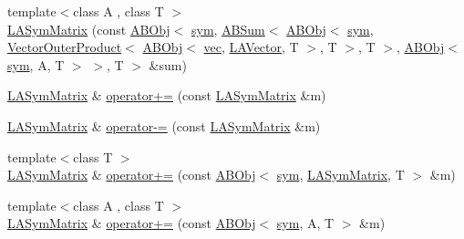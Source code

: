 \begin{DoxyCompactItemize}
\item 
{\footnotesize template$<$class A , class T $>$ }\\\mbox{\hyperlink{classROOT_1_1Minuit2_1_1LASymMatrix_aed0e1071ce94c05d4b18e7594db9a249}{L\+A\+Sym\+Matrix}} (const \mbox{\hyperlink{classROOT_1_1Minuit2_1_1ABObj}{A\+B\+Obj}}$<$ \mbox{\hyperlink{classROOT_1_1Minuit2_1_1sym}{sym}}, \mbox{\hyperlink{classROOT_1_1Minuit2_1_1ABSum}{A\+B\+Sum}}$<$ \mbox{\hyperlink{classROOT_1_1Minuit2_1_1ABObj}{A\+B\+Obj}}$<$ \mbox{\hyperlink{classROOT_1_1Minuit2_1_1sym}{sym}}, \mbox{\hyperlink{classROOT_1_1Minuit2_1_1VectorOuterProduct}{Vector\+Outer\+Product}}$<$ \mbox{\hyperlink{classROOT_1_1Minuit2_1_1ABObj}{A\+B\+Obj}}$<$ \mbox{\hyperlink{classROOT_1_1Minuit2_1_1vec}{vec}}, \mbox{\hyperlink{classROOT_1_1Minuit2_1_1LAVector}{L\+A\+Vector}}, T $>$, T $>$, T $>$, \mbox{\hyperlink{classROOT_1_1Minuit2_1_1ABObj}{A\+B\+Obj}}$<$ \mbox{\hyperlink{classROOT_1_1Minuit2_1_1sym}{sym}}, A, T $>$ $>$, T $>$ \&sum)
\item 
\mbox{\hyperlink{classROOT_1_1Minuit2_1_1LASymMatrix}{L\+A\+Sym\+Matrix}} \& \mbox{\hyperlink{classROOT_1_1Minuit2_1_1LASymMatrix_a36e303de732b9277e57d27f91bb0d56a}{operator+=}} (const \mbox{\hyperlink{classROOT_1_1Minuit2_1_1LASymMatrix}{L\+A\+Sym\+Matrix}} \&m)
\item 
\mbox{\hyperlink{classROOT_1_1Minuit2_1_1LASymMatrix}{L\+A\+Sym\+Matrix}} \& \mbox{\hyperlink{classROOT_1_1Minuit2_1_1LASymMatrix_acbe82f35c3fc1df7ccda6ab505be41c2}{operator-\/=}} (const \mbox{\hyperlink{classROOT_1_1Minuit2_1_1LASymMatrix}{L\+A\+Sym\+Matrix}} \&m)
\item 
{\footnotesize template$<$class T $>$ }\\\mbox{\hyperlink{classROOT_1_1Minuit2_1_1LASymMatrix}{L\+A\+Sym\+Matrix}} \& \mbox{\hyperlink{classROOT_1_1Minuit2_1_1LASymMatrix_a72081bd71d3b9a665f3480310100eb51}{operator+=}} (const \mbox{\hyperlink{classROOT_1_1Minuit2_1_1ABObj}{A\+B\+Obj}}$<$ \mbox{\hyperlink{classROOT_1_1Minuit2_1_1sym}{sym}}, \mbox{\hyperlink{classROOT_1_1Minuit2_1_1LASymMatrix}{L\+A\+Sym\+Matrix}}, T $>$ \&m)
\item 
{\footnotesize template$<$class A , class T $>$ }\\\mbox{\hyperlink{classROOT_1_1Minuit2_1_1LASymMatrix}{L\+A\+Sym\+Matrix}} \& \mbox{\hyperlink{classROOT_1_1Minuit2_1_1LASymMatrix_a748a3aba1dc95fa7759e0383e85b9374}{operator+=}} (const \mbox{\hyperlink{classROOT_1_1Minuit2_1_1ABObj}{A\+B\+Obj}}$<$ \mbox{\hyperlink{classROOT_1_1Minuit2_1_1sym}{sym}}, A, T $>$ \&m)
\item 

\end{DoxyCompactItemize}
